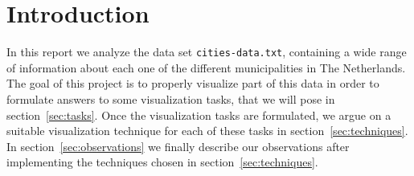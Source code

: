 \section{Introduction}\label{sec:intro}
In this report we analyze the data set \texttt{cities-data.txt}, containing a wide range of information about each one of the different municipalities in The Netherlands. The goal of this project is to properly visualize part of this data in order to formulate answers to some visualization tasks, that we will pose in section~\ref{sec:tasks}. Once the visualization tasks are formulated, we argue on a suitable visualization technique for each of these tasks in section~\ref{sec:techniques}. In section~\ref{sec:observations} we finally describe our observations after implementing the techniques chosen in section~\ref{sec:techniques}. 
